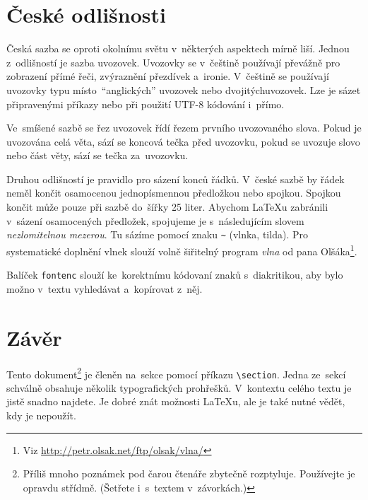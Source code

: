 \documentclass[a4paper, 10pt, twocolumn]{article}[22.2.2020]
\begin{document}
\section{České odlišnosti}
Česká sazba se oproti okolnímu světu v~některých aspektech mírně liší. Jednou z~odlišností je sazba uvozovek. Uvozovky se v~češtině používají převážně pro zobrazení přímé řeči, zvýraznění přezdívek a~ironie. V~češtině se používají uvozovky typu  místo~``anglických'' uvozovek nebo \textquotedbl dvojitých\textquotedbl uvozovek. Lze je sázet připravenými příkazy nebo při použití UTF-8 kódování i~přímo.
\par Ve~smíšené sazbě se řez uvozovek řídí řezem prvního uvozovaného slova. Pokud je uvozována celá věta, sází se koncová tečka před uvozovku, pokud se uvozuje slovo nebo část věty, sází se tečka za~uvozovku.
\par Druhou odlišností je pravidlo pro sázení konců řád\-ků. V~české sazbě by řádek neměl končit osamocenou jednopísmennou předložkou nebo spojkou. Spojkou  končit může pouze při sazbě do~šířky 25 liter. Abychom \LaTeX u zabránili v~sázení osamocených předložek, spojujeme je s~následujícím slovem \emph{nezlomitelnou mezerou}. Tu sázíme pomocí znaku {\texttt\~{}} (vlnka, tilda). Pro systematické doplnění vlnek slouží volně šiřitelný program \emph{vlna} od pana Olšáka\footnote{Viz \url{http://petr.olsak.net/ftp/olsak/vlna/}}.
\par Balíček \texttt{fontenc} slouží ke~korektnímu kódovaní zna\-ků s~diakritikou, aby bylo možno v~textu vyhledávat a~kopírovat z~něj.

\section{Závěr}
Tento dokument\footnote{Příliš mnoho poznámek pod čarou čtenáře zbytečně rozptyluje. Používejte je opravdu střídmě. (Šetřete i~s~textem v~závorkách.)} je členěn na~sekce pomocí příkazu \verb|\section|. Jedna ze~sekcí schválně obsahuje několik typografických prohřešků. V~kontextu celého textu je jistě snadno najdete. Je dobré znát možnosti \LaTeX u, ale je také nutné vědět, kdy je nepoužít.
\end{document}
